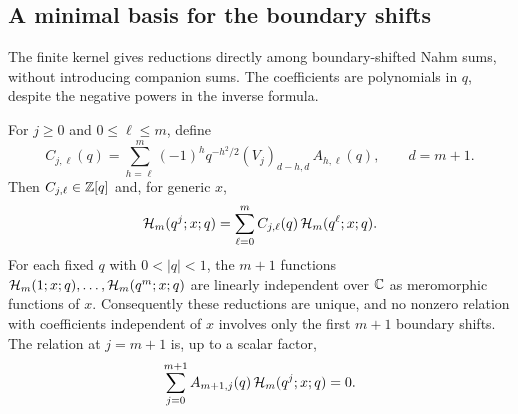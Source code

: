 \subsection{A minimal basis for the boundary shifts}
The finite kernel gives reductions directly among boundary-shifted Nahm sums, without introducing companion sums. The coefficients are polynomials in $q$, despite the negative powers in the inverse formula.

\begin{theorem}\label{thm:basis}
For $j\ge0$ and $0\le\ell\le m$, define
\begin{equation}\label{eq:Cjl}
C_{j,\ell}(q)=\sum_{h=\ell}^m(-1)^hq^{-h^2/2}(V_j)_{d-h,d}\,A_{h,\ell}(q),\qquad d=m+1.
\end{equation}
Then $C_{j,\ell}\in\mathbb{Z}[q]$ and, for generic $x$,
\begin{equation}\label{eq:basis}
\mathcal{H}_m(q^j;x;q)=\sum_{\ell=0}^mC_{j,\ell}(q)\,\mathcal{H}_m(q^\ell;x;q).
\end{equation}
For each fixed $q$ with $0<|q|<1$, the $m+1$ functions $\mathcal{H}_m(1;x;q),\dots,\mathcal{H}_m(q^m;x;q)$ are linearly independent over $\mathbb{C}$ as meromorphic functions of $x$. Consequently these reductions are unique, and no nonzero relation with coefficients independent of $x$ involves only the first $m+1$ boundary shifts. The relation at $j=m+1$ is, up to a scalar factor,
\[
\sum_{j=0}^{m+1}A_{m+1,j}(q)\,\mathcal{H}_m(q^j;x;q)=0.
\]
\end{theorem}

